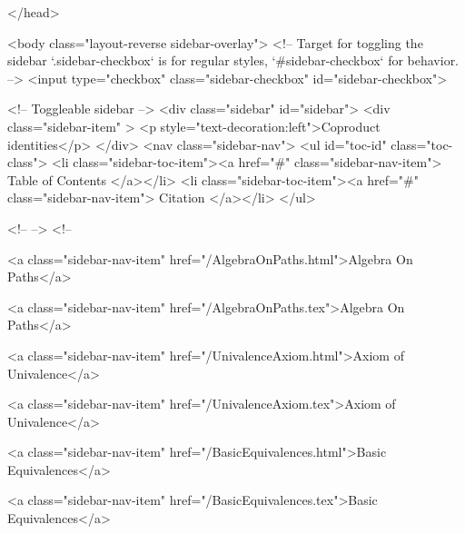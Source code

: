   
</head>




  <body class="layout-reverse sidebar-overlay">
    <!-- Target for toggling the sidebar `.sidebar-checkbox` is for regular
     styles, `#sidebar-checkbox` for behavior. -->
<input type="checkbox" class="sidebar-checkbox" id="sidebar-checkbox">

<!-- Toggleable sidebar -->
<div class="sidebar" id="sidebar">
  <div class="sidebar-item" >
    <p style="text-decoration:left">Coproduct identities</p>
  </div>
  <nav class="sidebar-nav">
    <ul id="toc-id" class="toc-class">
  <li class="sidebar-toc-item"><a href="#" class="sidebar-nav-item"> Table of Contents </a></li>
  <li class="sidebar-toc-item"><a href="#" class="sidebar-nav-item"> Citation </a></li>
</ul>


    <!--  -->
    <!-- 
      
    
      
    
      
    
      
    
      
        
      
    
      
        
          <a class="sidebar-nav-item" href="/AlgebraOnPaths.html">Algebra On Paths</a>
        
      
    
      
        
          <a class="sidebar-nav-item" href="/AlgebraOnPaths.tex">Algebra On Paths</a>
        
      
    
      
        
          <a class="sidebar-nav-item" href="/UnivalenceAxiom.html">Axiom of Univalence</a>
        
      
    
      
        
          <a class="sidebar-nav-item" href="/UnivalenceAxiom.tex">Axiom of Univalence</a>
        
      
    
      
        
          <a class="sidebar-nav-item" href="/BasicEquivalences.html">Basic Equivalences</a>
        
      
    
      
        
          <a class="sidebar-nav-item" href="/BasicEquivalences.tex">Basic Equivalences</a>
        
